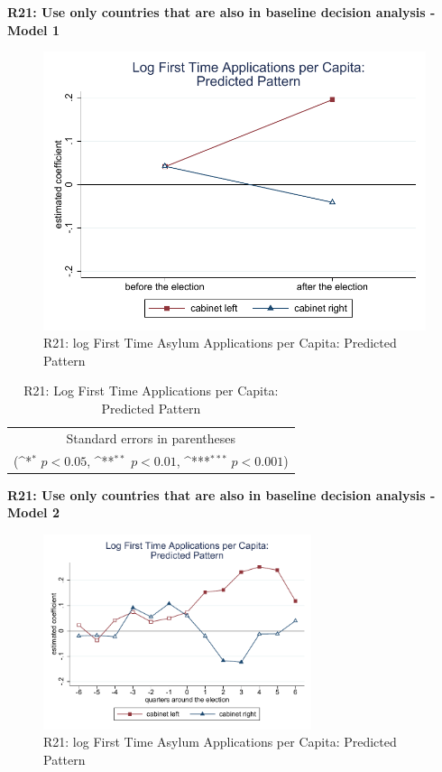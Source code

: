 \documentclass[10pt,a4paper]{scrartcl}
\begin{document}
\clearpage
\textbf{R21: Use only countries that are also in baseline decision analysis - Model 1}
\begin{figure}[!ht]
	\centering
	\includegraphics[width=1\textwidth]{figures_edited/app_graph1_R21.pdf}
	\caption{R21: log First Time Asylum Applications per Capita: Predicted Pattern}
\end{figure}

\begin{table}[!ht]\centering
	\renewcommand{\arraystretch}{1.25}
	\def\sym#1{\ifmmode^{#1}\else\(^{#1}\)\fi}
	\caption{R21: Log First Time Applications per Capita: Predicted Pattern}
	\begin{tabular}{l*{2}{c}}
		\hline\hline
		
		\hline\hline
		\multicolumn{3}{c}{\footnotesize Standard errors in parentheses} \\
		\multicolumn{3}{c}{\footnotesize (\sym{*} \(p<0.05\), \sym{**} \(p<0.01\), \sym{***} \(p<0.001\))}\\
	\end{tabular}
\end{table}

\clearpage
\textbf{R21: Use only countries that are also in baseline decision analysis - Model 2}
\begin{figure}[!ht]
	\centering
	\includegraphics[width=0.7\textwidth]{figures_edited/app_graph2_R21.pdf}
	\caption{R21: log First Time Asylum Applications per Capita: Predicted Pattern}
\end{figure}
\end{document}

